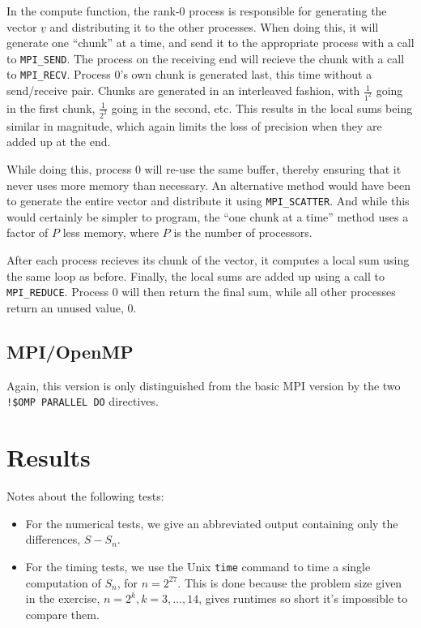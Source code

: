\documentclass[a4paper, 12pt]{article}
\begin{document}
        In the compute function, the rank-0 process is responsible for generating the vector $\underline{v}$ and distributing it to the other processes. When doing this, it will generate one ``chunk'' at a time, and send it to the appropriate process with a call to \texttt{MPI\_SEND}. The process on the receiving end will recieve the chunk with a call to \texttt{MPI\_RECV}. Process 0's own chunk is generated last, this time without a send/receive pair. Chunks are generated in an interleaved fashion, with $\frac{1}{1^2}$ going in the first chunk, $\frac{1}{2^2}$ going in the second, etc. This results in the local sums being similar in magnitude, which again limits the loss of precision when they are added up at the end.

        While doing this, process 0 will re-use the same buffer, thereby ensuring that it never uses more memory than necessary. An alternative method would have been to generate the entire vector and distribute it using \texttt{MPI\_SCATTER}. And while this would certainly be simpler to program, the ``one chunk at a time'' method uses a factor of $P$ less memory, where $P$ is the number of processors.

        After each process recieves its chunk of the vector, it computes a local sum using the same loop as before. Finally, the local sums are added up using a call to \texttt{MPI\_REDUCE}. Process 0 will then return the final sum, while all other processes return an unused value, 0.

    \subsection{MPI/OpenMP} %
    \label{sub:mpi_openmp}
        Again, this version is only distinguished from the basic MPI version by the two \texttt{!\$OMP PARALLEL DO} directives.

\section{Results} %
\label{sec:results}
    Notes about the following tests: 
    \begin{itemize}
        \item For the numerical tests, we give an abbreviated output containing only the differences, $S - S_n$.
        \item For the timing tests, we use the Unix \texttt{time} command to time a single computation of $S_n$, for $n = 2^{27}$. This is done because the problem size given in the exercise, $n = 2^k, k = 3, \ldots, 14$, gives runtimes so short it's impossible to compare them.
    \end{itemize}
\end{document}
